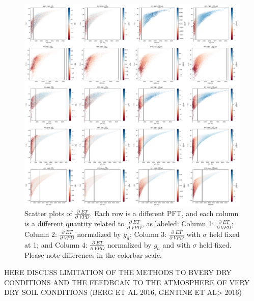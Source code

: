 \documentclass[draft,linenumbers]{agujournal}
\begin{document}
\begin{figure}[h]
\centering
\centerline{\includegraphics[width=1.4\textwidth]{./fig06.png}}
\caption{Scatter plots of $\frac{\partial \; ET}{\partial \; VPD}$. Each row is a different PFT, and each column is a different quantity related to $\frac{\partial \; ET}{\partial \; VPD}$, as labeled: Column 1: $\frac{\partial \; ET}{\partial \; VPD}$; Column 2: $\frac{\partial \; ET}{\partial \; VPD}$ normalized by $g_a$; Column 3: $\frac{\partial \; ET}{\partial \; VPD}$ with $\sigma$ held fixed at 1; and Column 4: $\frac{\partial \; ET}{\partial \; VPD}$ normalized by $g_a$ and with $\sigma$ held fixed. Please note differences in the colorbar scale.}
\label{real}
\end{figure}



HERE DISCUSS LIMITATION OF THE METHODS TO BVERY DRY CONDITIONS AND THE FEEDBCAK TO THE ATMOSPHERE OF VERY DRY SOIL CONDITIONS (BERG ET AL 2016, GENTINE ET AL> 2016)
\end{document}
